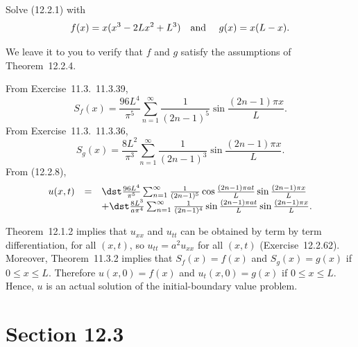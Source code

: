 \setcounter{example}{0}
\begin{example}
  \label{example:12.2.1} \rm Solve \textup{(12.2.1)} with
  \[
    f(x)=x(x^{3}-2Lx^{2}+L^{3}) \mbox{\quad and \quad}g(x)=x(L-x).
  \]
\end{example}
\begin{examplesolution}
\solution We leave it to you to verify that $f$ and $g$ satisfy the assumptions of
Theorem~12.2.4.

From Exercise~11.3.~\hspace*{-3pt}11.3.39,
\[
  S_{f}(x)=\frac{96L^{4}}{\pi^{5}}\sum_{n=1}^{\infty}\frac{1}{(2n-1)^{5}}\sin\frac{(2n-1)\pi x}{L}.
\]
From Exercise~11.3.~\hspace*{-3pt}11.3.36,
\[
  S_{g}(x)=\frac{8L^{2}}{\pi^{3}}\sum_{n=1}^{\infty}\frac{1}{(2n-1)^{3}}\sin\frac{(2n-1)\pi x}{L}.
\]
From \textup{(12.2.8)},
\[
  \begin{array}{rcl}
    u(x,t) & = & \dst\frac{96L^{4}}{\pi^{5}}\sum_{n=1}^{\infty}\frac{1}{(2n-1)^{5}} \cos\frac{(2n-1)\pi at}{L}\sin\frac{(2n-1)\pi x}{L}    \\
           &   & + \dst\frac{8L^{3}}{a\pi^{4}}\sum_{n=1}^{\infty}\frac{1}{(2n-1)^{4}} \sin\frac{(2n-1)\pi at}{L}\sin\frac{(2n-1)\pi x}{L}.
  \end{array}
\]

Theorem~12.1.2 implies that $u_{xx}$ and $u_{tt}$ can be obtained by term by term
differentiation, for all $(x,t)$, so $u_{tt}=a^{2}u_{xx}$ for all $(x,t)$
(Exercise~12.2.62). Moreover, Theorem~11.3.2 implies that $S_{f}(x)=f(x)$
and $S_{g}(x)=g(x)$ if $0\le x\le L$. Therefore $u(x,0)=f(x)$ and $u_{t}(x,0)=g(x)$ if
$0\le x\le L$. Hence, $u$ is an actual solution of the initial-boundary value problem.
\end{examplesolution}

\section*{Section 12.3}
\setcounter{chapter}{12}
\setcounter{section}{3}

